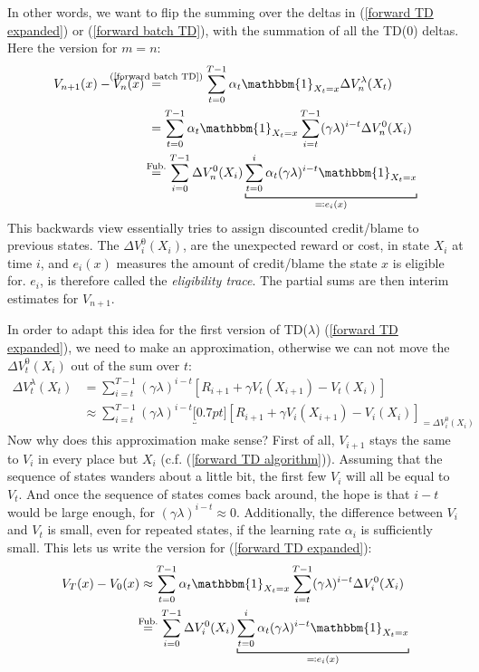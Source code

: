 In other words, we want to flip the summing over the deltas in (\ref{forward TD expanded}) or (\ref{forward batch TD}), with the summation of all the TD(\(0\)) deltas. Here the version for \(m=n\):
\begin{align*}
	V_{n+1}(x)-V_n(x)\;&\lxeq{\text{(\ref{forward batch TD})}} \sum_{t=0}^{T-1} \alpha_t \mathbbm{1}_{X_t=x}
	\Delta V^\lambda_n(X_t)\\
	&=\sum_{t=0}^{T-1} \alpha_t \mathbbm{1}_{X_t=x}
	\sum_{i=t}^{T-1}(\gamma\lambda)^{i-t} \Delta V^0_n(X_i)\\
	&\lxeq{\text{Fub.}}\sum_{i=0}^{T-1} \Delta V^0_n(X_i) 
	\underbracket[0.7pt]{\sum_{t=0}^{i} \alpha_t (\gamma\lambda)^{i-t} \mathbbm{1}_{X_t=x}}_{
		\eqqcolon e_i(x)
	}
\end{align*}
This backwards view essentially tries to assign discounted credit/blame to previous states. The \(\Delta V^0_i(X_i)\), are the unexpected reward or cost, in state \(X_i\) at time \(i\), and \(e_i(x)\) measures the amount of credit/blame the state \(x\) is eligible for. \(e_i\), is therefore called the \emph{eligibility trace}. The partial sums are then interim estimates for \(V_{n+1}\). 

In order to adapt this idea for the first version of TD(\(\lambda\)) (\ref{forward TD expanded}), we need to make an approximation, otherwise we can not move the \(\Delta V^0_t(X_i)\) out of the sum over \(t\):
\begin{align}
	\Delta V_t^\lambda (X_t)&=\sum_{i=t}^{T-1}(\gamma\lambda)^{i-t} \left[
		R_{i+1} + \gamma V_t(X_{i+1}) - V_t(X_{i})
	\right]
	\nonumber \\
	&\approx \sum_{i=t}^{T-1}(\gamma\lambda)^{i-t} 
	\underbracket[0.7pt]{\left[
		R_{i+1} + \gamma V_i(X_{i+1}) - V_i(X_{i})
	\right]}_{
		=\Delta V^0_i(X_i)
	}\label{approx}
\end{align}
Now why does this approximation make sense? First of all, \(V_{i+1}\) stays the same to \(V_i\) in every place but \(X_i\) (c.f. (\ref{forward TD algorithm})). Assuming that the sequence of states wanders about a little bit, the first few \(V_i\) will all be equal to \(V_t\). And once the sequence of states comes back around, the hope is that \(i-t\) would be large enough, for \((\gamma\lambda)^{i-t}\approx 0\). Additionally, the difference between \(V_i\) and \(V_t\) is small, even for repeated states, if the learning rate \(\alpha_i\) is sufficiently small. 
This lets us write the version for (\ref{forward TD expanded}):
\begin{align*}
	V_T(x)-V_0(x)%
	&\approx \sum_{t=0}^{T-1} \alpha_t \mathbbm{1}_{X_t=x}
	\sum_{i=t}^{T-1}(\gamma\lambda)^{i-t} \Delta V^0_i(X_i)\\
	&\lxeq{\text{Fub.}}\sum_{i=0}^{T-1} \Delta V^0_i(X_i) 
	\underbracket[0.7pt]{\sum_{t=0}^{i} \alpha_t (\gamma\lambda)^{i-t} \mathbbm{1}_{X_t=x}}_{
		\eqqcolon e_i(x)
	}
\end{align*}

